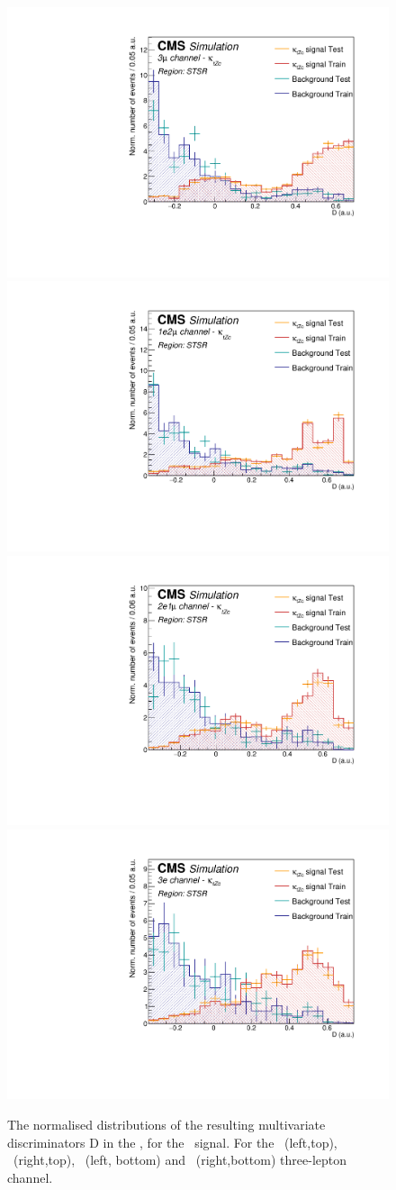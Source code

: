 \clearpage


\begin{figure}[htbp]
	\centering
	\includegraphics[width=0.49\linewidth]{6_Search/Figures/PlotsTechnics/SigVsBkgTestZctsingletopuuu}
	\includegraphics[width=0.49\linewidth]{6_Search/Figures/PlotsTechnics/SigVsBkgTestZctsingletopuue}
	\includegraphics[width=0.49\linewidth]{6_Search/Figures/PlotsTechnics/SigVsBkgTestZctsingletopeeu}
	\includegraphics[width=0.49\linewidth]{6_Search/Figures/PlotsTechnics/SigVsBkgTestZctsingletopeee}
	\caption{The normalised distributions of the resulting  multivariate discriminators D in the \STSR, for the \Zct\ signal. For the \mumumu\ (left,top), \emumu\ (right,top), \eemu\ (left, bottom) and \eee\ (right,bottom) three-lepton channel.}
	\label{fig:sigvsbkgtestzctsingletop}
\end{figure}

